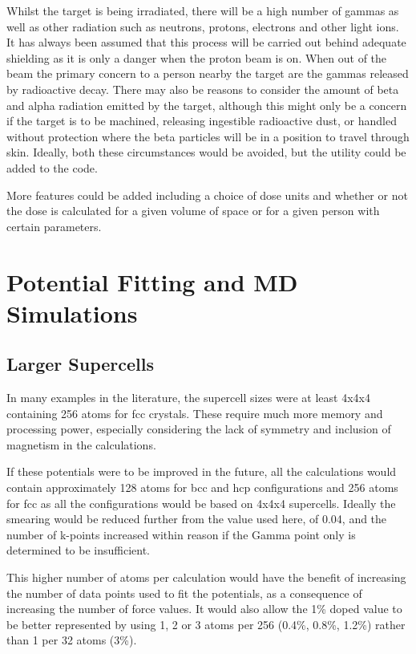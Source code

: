 Whilst the target is being irradiated, there will be a high number of gammas as well as other radiation such as neutrons, protons, electrons and other light ions.  It has always been assumed that this process will be carried out behind adequate shielding as it is only a danger when the proton beam is on.  When out of the beam the primary concern to a person nearby the target are the gammas released by radioactive decay.  There may also be reasons to consider the amount of beta and alpha radiation emitted by the target, although this might only be a concern if the target is to be machined, releasing ingestible radioactive dust, or handled without protection where the beta particles will be in a position to travel through skin.  Ideally, both these circumstances would be avoided, but the utility could be added to the code.

More features could be added including a choice of dose units and whether or not the dose is calculated for a given volume of space or for a given person with certain parameters.



\section{Potential Fitting and MD Simulations}

\subsection{Larger Supercells}

In many examples in the literature, the supercell sizes were at least 4x4x4 containing 256 atoms for \acrshort{fcc} crystals.  These require much more memory and processing power, especially considering the lack of symmetry and inclusion of magnetism in the calculations.  

If these potentials were to be improved in the future, all the calculations would contain approximately 128 atoms for \acrshort{bcc} and \acrshort{hcp} configurations and 256 atoms for \acrshort{fcc} as all the configurations would be based on 4x4x4 supercells.  Ideally the smearing would be reduced further from the value used here, of 0.04, and the number of k-points increased within reason if the Gamma point only is determined to be insufficient.

This higher number of atoms per calculation would have the benefit of increasing the number of data points used to fit the potentials, as a consequence of increasing the number of force values.  It would also allow the 1\% doped value to be better represented by using 1, 2 or 3 atoms per 256 (0.4\%, 0.8\%, 1.2\%) rather than 1 per 32 atoms (3\%).

